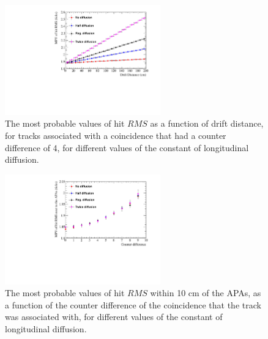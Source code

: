 \begin{figure}
  \centering
  \includegraphics[width=0.6\textwidth]{Canvas_CountDiff4_All_Positions_Diffusion}
  \caption[The most probable values of hit $RMS$ as a function of drift distance, for tracks associated with a coincidence that had a counter difference of 4, for different values of the constant of longitudinal diffusion]
          {The most probable values of hit $RMS$ as a function of drift distance, for tracks associated with a coincidence that had a counter difference of 4, for different values of the constant of longitudinal diffusion.}
  \label{fig:DiffLDiff_CDiff4}
\end{figure}

\begin{figure}
  \centering
  \includegraphics[width=0.6\textwidth]{Canvas_All_Angles_RMS0cm_Diffusion}
  \caption[The angular dependence of hits within 10 cm of the APAs, for different values of the constant of longitudinal diffusion]
          {The most probable values of hit $RMS$ within 10 cm of the APAs, as a function of the counter difference of the coincidence that the track was associated with, for different values of the constant of longitudinal diffusion.}
  \label{fig:DiffLDiff_RMS0cm}
\end{figure}

